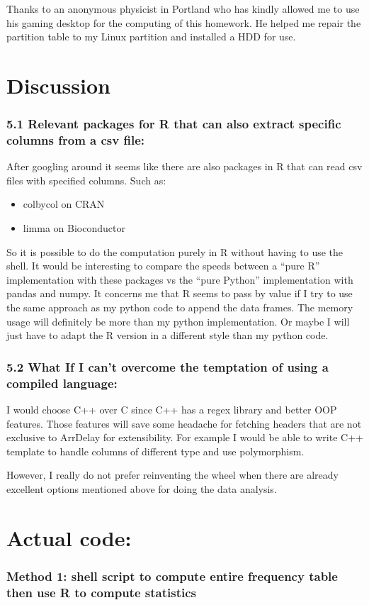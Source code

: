 \documentclass[letterpaper,10pt,english]{/usr/local/lib/python2.7/dist-packages/sphinx/texinputs/sphinxhowto}
\begin{document}
Thanks to an anonymous physicist in Portland who has kindly allowed me
to use his gaming desktop for the computing of this homework. He helped
me repair the partition table to my Linux partition and installed a HDD
for use.\part{
  Discussion
}\section{5.1 Relevant packages for R that can also extract specific columns from
a csv file:}After googling around it seems like there are also packages in R that
can read csv files with specified columns. Such as:

\begin{itemize}
\itemsep1pt\parskip0pt
\item
  colbycol on CRAN
\item
  limma on Bioconductor
\end{itemize}

So it is possible to do the computation purely in R without having to
use the shell. It would be interesting to compare the speeds between a
``pure R'' implementation with these packages vs the ``pure Python''
implementation with pandas and numpy. It concerns me that R seems to
pass by value if I try to use the same approach as my python code to
append the data frames. The memory usage will definitely be more than my
python implementation. Or maybe I will just have to adapt the R version
in a different style than my python code.\section{5.2 What If I can't overcome the temptation of using a compiled
language:}I would choose C++ over C since C++ has a regex library and better OOP
features. Those features will save some headache for fetching headers
that are not exclusive to ArrDelay for extensibility. For example I
would be able to write C++ template to handle columns of different type
and use polymorphism.

However, I really do not prefer reinventing the wheel when there are
already excellent options mentioned above for doing the data analysis.
\part{
  Actual code:
}\section{Method 1: shell script to compute entire frequency table then use R to
compute statistics}
\end{document}
